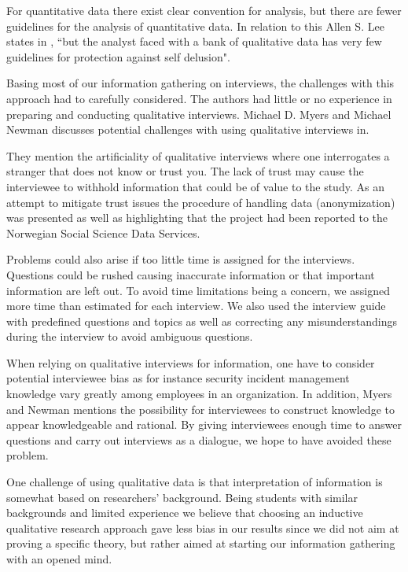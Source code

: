 For quantitative data there exist clear convention for analysis, but there are fewer guidelines for the analysis of quantitative data. In relation to this Allen S. Lee states in \cite{lee1989scientific}, ``but the analyst faced with a bank of qualitative data has very few guidelines for protection against self delusion".

Basing most of our information gathering on interviews, the challenges with this approach had to carefully considered. The authors had little or no experience in preparing and conducting qualitative interviews. Michael D. Myers and Michael Newman discusses potential challenges with using qualitative interviews in\cite{myers2007qualitative}. 

They mention the artificiality of qualitative interviews where one interrogates a stranger that does not know or trust you. The lack of trust may cause the interviewee to withhold information that could be of value to the study. As an attempt to mitigate trust issues the procedure of handling data (anonymization) was presented as well as highlighting that the project had been reported to the Norwegian Social Science Data Services.   

Problems could also arise if too little time is assigned for the interviews. Questions could be rushed causing inaccurate information or that important information are left out. To avoid time limitations being a concern, we assigned more time than estimated for each interview. We also used the interview guide with predefined questions and topics as well as correcting any misunderstandings during the interview to avoid ambiguous questions.

When relying on qualitative interviews for information, one have to consider potential interviewee bias as for instance security incident management knowledge vary greatly among employees in an organization. In addition, Myers and Newman mentions the possibility for interviewees to construct knowledge to appear knowledgeable and rational. By giving interviewees enough time to answer questions and carry out interviews as a dialogue, we hope to have avoided these problem.

One challenge of using qualitative data is that interpretation of information is somewhat based on researchers' background. Being students with similar backgrounds and limited experience we believe that choosing an inductive qualitative research approach gave less bias in our results since we did not aim at proving a specific theory, but rather aimed at starting our information gathering with an opened mind. 



